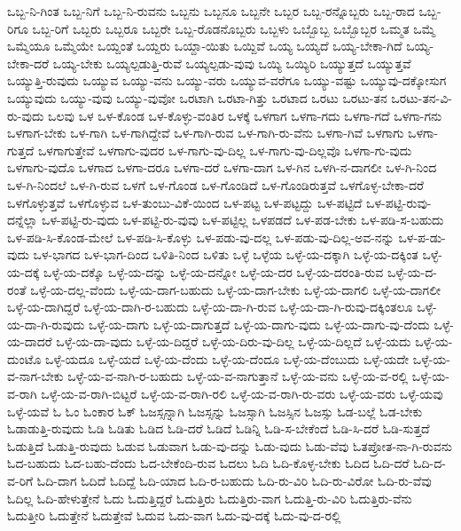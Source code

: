 {ಒಬ್ಬ-ನಿ-ಗಿಂತ
ಒಬ್ಬ-ನಿಗೆ
ಒಬ್ಬ-ನಿ-ರುವನು
ಒಬ್ಬನು
ಒಬ್ಬನೂ
ಒಬ್ಬನೇ
ಒಬ್ಬರ
ಒಬ್ಬ-ರನ್ನೊಬ್ಬರು
ಒಬ್ಬ-ರಾದ
ಒಬ್ಬ-ರಿಗೂ
ಒಬ್ಬ-ರಿಗೆ
ಒಬ್ಬರು
ಒಬ್ಬರೂ
ಒಬ್ಬರೇ
ಒಬ್ಬ-ರೊಡನೊಬ್ಬರು
ಒಬ್ಬಳು
ಒಬ್ಬೊಬ್ಬ
ಒಬ್ಬೊಬ್ಬರ
ಒಮ್ಮತ
ಒಮ್ಮೆ
ಒಮ್ಮೆಯೂ
ಒಮ್ಮೆಯೇ
ಒಯ್ದಂತೆ
ಒಯ್ದರು
ಒಯ್ದಾ-ಯಿತು
ಒಯ್ದಿವೆ
ಒಯ್ಯ
ಒಯ್ಯದೆ
ಒಯ್ಯ-ಬೇಕಾ-ಗಿದೆ
ಒಯ್ಯ-ಬೇಕಾ-ದರೆ
ಒಯ್ಯ-ಬೇಕು
ಒಯ್ಯಲ್ಪಡುತ್ತಿ-ರುವೆ
ಒಯ್ಯಲ್ಪಡು-ವುವು
ಒಯ್ಯಿ
ಒಯ್ಯಿರಿ
ಒಯ್ಯುತ್ತದೆ
ಒಯ್ಯುತ್ತವೆ
ಒಯ್ಯುತ್ತಿ-ರುವುದು
ಒಯ್ಯುವ
ಒಯ್ಯು-ವನು
ಒಯ್ಯು-ವರು
ಒಯ್ಯುವ-ವರೆಗೂ
ಒಯ್ಯು-ವಷ್ಟು
ಒಯ್ಯುವು-ದಕ್ಕೋಸುಗ
ಒಯ್ಯುವುದು
ಒಯ್ಯು-ವುವು
ಒಯ್ಯು-ವುವೋ
ಒರಟಾಗಿ
ಒರಟಾ-ಗಿತ್ತು
ಒರಟಾದ
ಒರಟು
ಒರಟು-ತನ
ಒರಟು-ತನ-ವಿ-ರು-ವುದು
ಒಲವು
ಒಳ
ಒಳ-ಕೊಂಡ
ಒಳ-ಕೊಳ್ಳು-ವಂತಿರ
ಒಳಕ್ಕೆ
ಒಳಗಾಗ
ಒಳಗಾ-ಗದು
ಒಳಗಾ-ಗದೆ
ಒಳಗಾ-ಗನು
ಒಳಗಾಗ-ಬೇಕು
ಒಳ-ಗಾಗಿ
ಒಳ-ಗಾಗಿದ್ದೇವೆ
ಒಳ-ಗಾಗಿ-ರುವ
ಒಳ-ಗಾಗಿ-ರು-ವೆನು
ಒಳಗಾ-ಗಿವೆ
ಒಳಗಾಗು
ಒಳಗಾ-ಗುತ್ತದೆ
ಒಳಗಾಗುತ್ತೇವೆ
ಒಳಗಾಗು-ವುದರ
ಒಳ-ಗಾಗು-ವು-ದಿಲ್ಲ
ಒಳ-ಗಾಗು-ವು-ದಿಲ್ಲವೊ
ಒಳಗಾ-ಗು-ವುದು
ಒಳಗಾಗು-ವುದೊ
ಒಳಗಾದ
ಒಳಗಾ-ದರೂ
ಒಳಗಾ-ದರೆ
ಒಳಗಾ-ದಾಗ
ಒಳ-ಗಿನ
ಒಳಗಿ-ನ-ದಾಗಲೀ
ಒಳ-ಗಿ-ನಿಂದ
ಒಳ-ಗಿ-ನಿಂದಲೆ
ಒಳ-ಗಿ-ರುವ
ಒಳಗೆ
ಒಳ-ಗೊಂಡ
ಒಳ-ಗೊಂಡಿದೆ
ಒಳ-ಗೊಂಡಿರುತ್ತವೆ
ಒಳಗೊಳ್ಳ-ಬೇಕಾ-ದರೆ
ಒಳಗೊಳ್ಳುತ್ತವೆ
ಒಳಗೊಳ್ಳುವ
ಒಳ-ತುಂಬು-ವಿಕೆ-ಯಿಂದ
ಒಳ-ಪಟ್ಟ
ಒಳ-ಪಟ್ಟದ್ದು
ಒಳ-ಪಟ್ಟಿದೆ
ಒಳ-ಪಟ್ಟಿ-ರುವು-ದನ್ನೆಲ್ಲಾ
ಒಳ-ಪಟ್ಟಿ-ರು-ವುದು
ಒಳ-ಪಟ್ಟಿ-ರು-ವುವು
ಒಳ-ಪಟ್ಟಿಲ್ಲ
ಒಳಪಡದೆ
ಒಳ-ಪಡ-ಬೇಕು
ಒಳ-ಪಡಿ-ಸ-ಬಹುದು
ಒಳ-ಪಡಿ-ಸಿ-ಕೊಂಡ-ಮೇಲೆ
ಒಳ-ಪಡಿ-ಸಿ-ಕೊಳ್ಳು
ಒಳ-ಪಡು-ವು-ದಲ್ಲ
ಒಳ-ಪಡು-ವು-ದಿಲ್ಲ-ಅವ-ನನ್ನು
ಒಳ-ಪ-ಡು-ವುದು
ಒಳ-ಭಾಗದ
ಒಳ-ಭಾಗ-ದಿಂದ
ಒಳಿತಿ-ನಿಂದ
ಒಳಿತು
ಒಳ್ಳೆ
ಒಳ್ಳೆಯ
ಒಳ್ಳೆ-ಯ-ದಕ್ಕಾಗಿ
ಒಳ್ಳೆ-ಯ-ದಕ್ಕಿಂತ
ಒಳ್ಳೆ-ಯ-ದಕ್ಕೆ
ಒಳ್ಳೆ-ಯ-ದಕ್ಕೊ
ಒಳ್ಳೆ-ಯ-ದನ್ನು
ಒಳ್ಳೆ-ಯ-ದನ್ನೋ
ಒಳ್ಳೆ-ಯ-ದರ
ಒಳ್ಳೆ-ಯ-ದರಂತಿ-ರುವ
ಒಳ್ಳೆ-ಯ-ದ-ರಂತೆ
ಒಳ್ಳೆ-ಯ-ದಲ್ಲ-ವೆಂದು
ಒಳ್ಳೆ-ಯ-ದಾಗ-ಬಹುದು
ಒಳ್ಳೆ-ಯ-ದಾಗ-ಬೇಕು
ಒಳ್ಳೆ-ಯ-ದಾಗಲಿ
ಒಳ್ಳೆ-ಯ-ದಾಗಲೀ
ಒಳ್ಳೆ-ಯ-ದಾಗಿದ್ದರೆ
ಒಳ್ಳೆ-ಯ-ದಾಗಿ-ರ-ಬಹುದು
ಒಳ್ಳೆ-ಯ-ದಾ-ಗಿ-ರುವ
ಒಳ್ಳೆ-ಯ-ದಾ-ಗಿ-ರುವು-ದಕ್ಕಿಂತಲೂ
ಒಳ್ಳೆ-ಯ-ದಾ-ಗಿ-ರುವುದು
ಒಳ್ಳೆ-ಯ-ದಾಗು
ಒಳ್ಳೆ-ಯ-ದಾಗುತ್ತದೆ
ಒಳ್ಳೆ-ಯ-ದಾಗು-ವುದು
ಒಳ್ಳೆ-ಯ-ದಾಗು-ವು-ದೆಂದು
ಒಳ್ಳೆ-ಯ-ದಾದರೆ
ಒಳ್ಳೆ-ಯ-ದಾ-ವುದು
ಒಳ್ಳೆ-ಯ-ದಿದ್ದರೆ
ಒಳ್ಳೆ-ಯ-ದಿರು-ವು-ದಿಲ್ಲ
ಒಳ್ಳೆ-ಯ-ದಿಲ್ಲದೆ
ಒಳ್ಳೆ-ಯದು
ಒಳ್ಳೆ-ಯ-ದುಂಟೊ
ಒಳ್ಳೆ-ಯದೂ
ಒಳ್ಳೆ-ಯದೆ
ಒಳ್ಳೆ-ಯ-ದೆಂದು
ಒಳ್ಳೆ-ಯ-ದೆಂದೂ
ಒಳ್ಳೆ-ಯ-ದೆಂಬುದು
ಒಳ್ಳೆ-ಯದೇ
ಒಳ್ಳೆ-ಯ-ವ-ನಾಗ-ಬೇಕು
ಒಳ್ಳೆ-ಯ-ವ-ನಾಗಿ-ರ-ಬಹುದು
ಒಳ್ಳೆ-ಯ-ವ-ನಾಗುತ್ತಾನೆ
ಒಳ್ಳೆ-ಯ-ವನು
ಒಳ್ಳೆ-ಯ-ವ-ರಲ್ಲಿ
ಒಳ್ಳೆ-ಯ-ವ-ರಾಗಿ
ಒಳ್ಳೆ-ಯ-ವ-ರಾಗಿ-ಬಿಟ್ಟರೆ
ಒಳ್ಳೆ-ಯ-ವ-ರಾಗಿ-ರಲಿ
ಒಳ್ಳೆ-ಯ-ವ-ರಾಗಿ-ರು-ವರು
ಒಳ್ಳೆ-ಯ-ವರು
ಒಳ್ಳೆ-ಯವು
ಒಳ್ಳೆ-ಯವೆ
ಓ
ಓಂ
ಓಂಕಾರ
ಓಕ್
ಓಜಸ್ಸನ್ನಾಗಿ
ಓಜಸ್ಸನ್ನು
ಓಜಸ್ಸಾಗಿ
ಓಜಸ್ಸಿನ
ಓಜಸ್ಸು
ಓಡ-ಬಲ್ಲೆ
ಓಡ-ಬೇಕು
ಓಡಾಡುತ್ತಿ-ರುವುದು
ಓಡಿ
ಓಡಿತು
ಓಡಿದ
ಓಡಿ-ದರೆ
ಓಡಿದೆ
ಓಡಿನ್ನಿ
ಓಡಿ-ಸ-ಬೇಕೆಂದೆ
ಓಡಿ-ಸಿ-ದರೆ
ಓಡಿ-ಸುತ್ತದೆ
ಓಡುತ್ತಿದೆ
ಓಡುತ್ತಿ-ರುವುದು
ಓಡುವ
ಓಡುವಾಗ
ಓಡು-ವು-ದನ್ನು
ಓಡು-ವುದು
ಓಡು-ವೆವು
ಓತಪ್ರೋತ-ನಾ-ಗಿ-ರುವನು
ಓದ-ಬಹುದು
ಓದ-ಬಹು-ದೆಂದು
ಓದ-ಬೇಕೆಂದಿ-ರುವ
ಓದಲು
ಓದಿ
ಓದಿ-ಕೊಳ್ಳ-ಬೇಕು
ಓದಿದ
ಓದಿ-ದರೆ
ಓದಿ-ದ-ವ-ರಿಗೆ
ಓದಿ-ದಾಗ
ಓದಿದೆ
ಓದಿದ್ದೆ
ಓದಿ-ಯಾದ
ಓದಿ-ರ-ಬಹುದು
ಓದಿ-ರು-ವಿರಿ
ಓದಿ-ರು-ವಿರೋ
ಓದಿ-ರು-ವೆವು
ಓದಿಲ್ಲ
ಓದಿ-ಹೇಳುತ್ತೇನೆ
ಓದು
ಓದುತ್ತಿದ್ದರೆ
ಓದುತ್ತಿರು
ಓದುತ್ತಿರು-ವಾಗ
ಓದುತ್ತಿ-ರು-ವಿರಿ
ಓದುತ್ತಿರು-ವೆನು
ಓದುತ್ತೀರಿ
ಓದುತ್ತೇನೆ
ಓದುತ್ತೇವೆ
ಓದುವ
ಓದು-ವಾಗ
ಓದು-ವು-ದಕ್ಕೆ
ಓದು-ವು-ದ-ರಲ್ಲಿ
}
